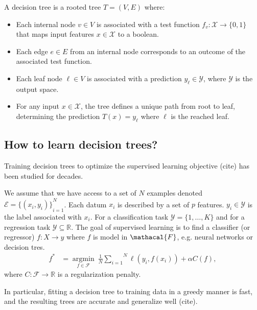 \begin{definition}
A decision tree is a rooted tree $T = (V, E)$ where:
\begin{itemize}
\item Each internal node $v \in V$ is associated with a test function $f_v: \mathcal{X} \rightarrow \{0, 1\}$ that maps input features $x \in \mathcal{X}$ to a boolean.
\item Each edge $e \in E$ from an internal node corresponds to an outcome of the associated test function.
\item Each leaf node $\ell \in V$ is associated with a prediction $y_\ell \in \mathcal{Y}$, where $\mathcal{Y}$ is the output space.
\item For any input $x \in \mathcal{X}$, the tree defines a unique path from root to leaf, determining the prediction $T(x) = y_\ell$ where $\ell$ is the reached leaf.
\end{itemize}
\end{definition}
\subsection{How to learn decision trees?}
Training decision trees to optimize the supervised learning objective (cite) has been studied for decades.

\begin{definition}
We assume that we have access to a set of $N$ examples denoted $\mathcal{E} = {\{(x_i, y_i)\}}_{i=1}^N$. Each datum $x_i$ is described by a set of $p$ features. $y_i \in {\mathcal Y}$ is the label associated with $x_i$.
For a classification task $\mathcal{Y}=\{1,\ldots,K\}$ and for a regression task $\mathcal{Y}\subseteq \mathbb{R}$.
The goal of supervised learning is to find a classifier (or regressor) $f:X \rightarrow  y$ where $f$ is model in $\mathacal{F}$, e.g. neural networks or decision tres.
\begin{align}
    f^* &= \underset{f \in \mathcal{F}}{\operatorname{argmin}}\ \frac{1}{N}\overset{N}{\underset{i=1}{\sum}}{\ell}(y_i, f(x_i)) + \alpha C(f),
    \label{eq:suplearning}
\end{align}
where $C: \mathcal{F} \rightarrow \mathbb{R}$ is a regularization penalty.
\end{definition}
In particular, fitting a decision tree to training data in a greedy manner is fast, and the resulting trees are accurate and generalize well (cite).

